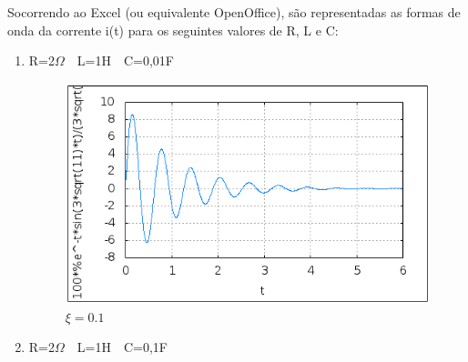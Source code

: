 \documentclass[titlepage, a4paper, 11pt, reqno, openany]{report}
\begin{document}
\begin{enumerate}
\begin{minipage}{0.95\linewidth}
\label{figura 17}
\end{minipage}\par
%
Socorrendo  ao Excel (ou equivalente OpenOffice), s\~{a}o representadas  as formas  de onda  da corrente  i(t) para os seguintes valores  de R, L e C:\par
%
\begin{enumerate}
\item
R=2$\Omega$\ \  L=1H\ \  C=0,01F\par
\begin{figure}[H]
\centering
\includegraphics[scale=0.8]{./image/image_a.png}
\caption{$\xi=0.1$}
\label{figura 18}
\end{figure}\par
\item
R=2$\Omega$\ \  L=1H\ \  C=0,1F\par
\begin{figure}[H]
\centering

\end{figure}
\end{enumerate}
\end{enumerate}
\end{document}
